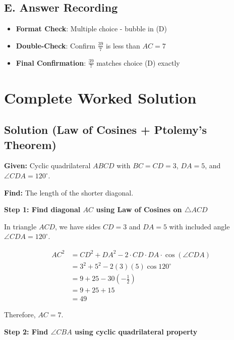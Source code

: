 \documentclass[11pt]{article}
\begin{document}
\begin{competitionbox}
\subsection*{E. Answer Recording}
\begin{itemize}[leftmargin=*]
    \item \textbf{Format Check}: Multiple choice - bubble in (D)
    \item \textbf{Double-Check}: Confirm $\frac{39}{7}$ is less than $AC = 7$
    \item \textbf{Final Confirmation}: $\frac{39}{7}$ matches choice (D) exactly
\end{itemize}
\end{competitionbox}

\section*{Complete Worked Solution}

\subsection*{Solution (Law of Cosines + Ptolemy's Theorem)}

\textbf{Given:} Cyclic quadrilateral $ABCD$ with $BC = CD = 3$, $DA = 5$, and $\angle CDA = 120^\circ$.

\textbf{Find:} The length of the shorter diagonal.

\vspace{0.3cm}

\textbf{Step 1: Find diagonal $AC$ using Law of Cosines on $\triangle ACD$}

In triangle $ACD$, we have sides $CD = 3$ and $DA = 5$ with included angle $\angle CDA = 120^\circ$.

\begin{align*}
AC^2 &= CD^2 + DA^2 - 2 \cdot CD \cdot DA \cdot \cos(\angle CDA) \\
&= 3^2 + 5^2 - 2(3)(5)\cos 120^\circ \\
&= 9 + 25 - 30 \left(-\frac{1}{2}\right) \\
&= 9 + 25 + 15 \\
&= 49
\end{align*}

Therefore, $AC = 7$.

\vspace{0.3cm}

\textbf{Step 2: Find $\angle CBA$ using cyclic quadrilateral property}
\end{document}
